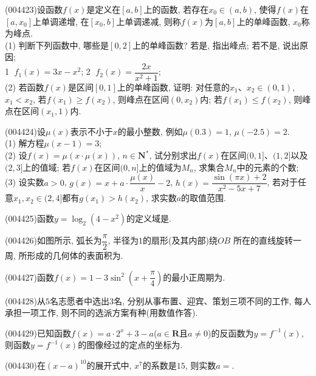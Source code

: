 \item (004423)设函数$f(x)$是定义在$[a,b]$上的函数, 若存在$x_0\in (a,b)$, 使得$f(x)$在$[a,x_0]$上单调递增, 在$[x_0,b]$上单调递减, 则称$f(x)$为$[a,b]$上的单峰函数, $x_0$称为峰点.\\
(1) 判断下列函数中, 哪些是$[0,2]$上的单峰函数? 若是, 指出峰点; 若不是, 说出原因;\\
\textcircled{1}  $f_1(x)=3x-x^2$; \textcircled{2}  $f_2(x)=\dfrac{2x}{{x^2}+1}$;\\
(2) 若函数$f(x)$是区间$[0,1]$上的单峰函数, 证明: 对任意的$x_1$、$x_2\in (0,1)$, $x_1<x_2$, 若$f(x_1)\ge f(x_2)$, 则峰点在区间$(0,x_2)$内; 若$f(x_1)\le f(x_2)$, 则峰点在区间$(x_1,1)$内.
\item (004424)设$\mu (x)$表示不小于$x$的最小整数, 例如$\mu(0.3)=1$, $\mu(-2.5)=2$.\\
(1) 解方程$\mu(x-1)=3$;\\
(2) 设$f(x)=\mu (x\cdot \mu (x))$, $n\in \mathbf{N}^*$, 试分别求出$f(x)$在区间$(0,1]$、$(1,2]$以及$(2,3]$上的值域; 若$f(x)$在区间$(0,n]$上的值域为$M_n$, 求集合$M_n$中的元素的个数;\\
(3) 设实数$a>0$, $g(x)=x+a\cdot \dfrac{\mu (x)}x-2$, $h(x)=\dfrac{\sin (\pi x)+2}{x^2-5x+7}$, 若对于任意$x_1,x_2\in (2,4]$都有$g(x_1)>h(x_2)$, 求实数$a$的取值范围.
\item (004425)函数$y=\log_2(4-x^2)$的定义域是.
\item (004426)如图所示, 弧长为$\dfrac{\pi}2$, 半径为$1$的扇形(及其内部)绕$OB$
所在的直线旋转一周, 所形成的几何体的表面积为.
\begin{center}
\end{center}
\item (004427)函数$f(x)=1-3\sin ^2(x+\dfrac{\pi}4)$的最小正周期为.
\item (004428)从$5$名志愿者中选出$3$名, 分别从事布置、迎宾、策划三项不同的工作, 每人承担一项工作, 则不同的选派方案有种(用数值作答).
\item (004429)已知函数$f(x)=a\cdot 2^x+3-a$($a\in \mathbf{R}$且$a\ne 0$)的反函数为$y=f^{-1}(x)$, 则函数$y=f^{-1}(x)$的图像经过的定点的坐标为.
\item (004430)在$(x-a)^{10}$的展开式中, $x^7$的系数是$15$, 则实数$a=$.
